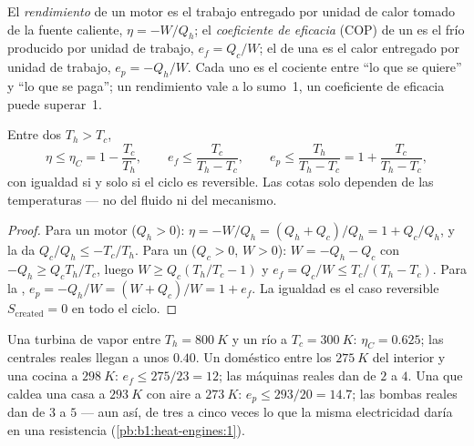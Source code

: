 \begin{definition}\label{def:b1:heat-engines:efficiency}
El \emph{rendimiento} de un motor es el trabajo entregado por unidad de
calor tomado de la fuente caliente, $\eta = -W/Q_h$; el
\emph{coeficiente de eficacia} (COP) de un  es el frío
producido por unidad de trabajo, $e_f = Q_c/W$; el de una 
es el calor entregado por unidad de trabajo, $e_p = -Q_h/W$. Cada uno es
el cociente entre ``lo que se quiere'' y ``lo que se paga''; un
rendimiento vale a lo sumo~1, un coeficiente de eficacia puede
superar~1.
\end{definition}

\begin{theorem}[Carnot]\label{thm:b1:heat-engines:carnot}
Entre dos  $T_h > T_c$,
\[
\eta \leq \eta_C = 1 - \frac{T_c}{T_h}, \qquad
e_f \leq \frac{T_c}{T_h - T_c}, \qquad
e_p \leq \frac{T_h}{T_h - T_c} = 1 + \frac{T_c}{T_h - T_c},
\]
con igualdad si y solo si el ciclo es reversible. Las cotas solo dependen
de las temperaturas --- no del fluido ni del mecanismo.
\end{theorem}

\begin{proof}
Para un motor ($Q_h > 0$): $\eta = -W/Q_h = (Q_h + Q_c)/Q_h = 1 + Q_c/Q_h$,
y la  da $Q_c/Q_h \leq -T_c/T_h$. Para un
 ($Q_c > 0$, $W > 0$): $W = -Q_h - Q_c$ con $-Q_h \geq Q_c T_h/T_c$,
luego $W \geq Q_c(T_h/T_c - 1)$ y $e_f = Q_c/W \leq T_c/(T_h - T_c)$.
Para la , $e_p = -Q_h/W = (W + Q_c)/W = 1 + e_f$. La igualdad
es el caso reversible $S_{\mathrm{created}} = 0$ en todo el ciclo.
\end{proof}

\begin{example}\label{ex:b1:heat-engines:numbers}
Una turbina de vapor entre $T_h = \qty{800}{K}$ y un río a
$T_c = \qty{300}{K}$: $\eta_C = 0.625$; las centrales reales llegan a unos $0.40$.
Un  doméstico entre los $\qty{275}{K}$ del interior y una cocina a
$\qty{298}{K}$: $e_f \leq 275/23 = 12$; las máquinas reales dan de $2$ a $4$. Una
 que caldea una casa a $\qty{293}{K}$ con aire a $\qty{273}{K}$:
$e_p \leq 293/20 = 14.7$; las bombas reales dan de $3$ a $5$ --- aun así, de
tres a cinco veces lo que la misma electricidad daría en una resistencia
(\cref{pb:b1:heat-engines:1}).
\end{example}

